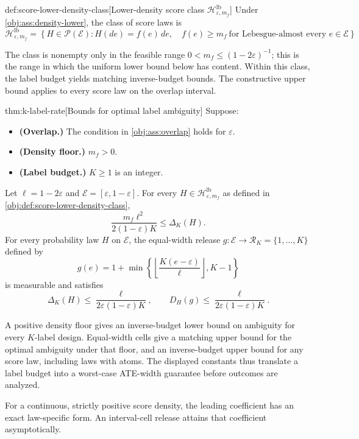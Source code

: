 \documentclass[11pt]{article}
\begin{document}
\begin{definitionv}{def:score-lower-density-class}[Lower-density score class $\mathcal H^{\mathrm{lb}}_{\varepsilon,m_f}$]
Under \cref{obj:ass:density-lower}, the class of score laws is
\[
\mathcal H^{\mathrm{lb}}_{\varepsilon,m_f}
=
\left\{
H\in\mathcal P(\mathcal E):
H(de)=f(e)\,de,\quad
f(e)\ge m_f\ \text{for Lebesgue-almost every }e\in\mathcal E
\right\}.
\]
\end{definitionv}

The class is nonempty only in the feasible range \(0<m_f\le (1-2\varepsilon)^{-1}\); this is the range in which the uniform lower bound below has content. Within this class, the label budget yields matching inverse-budget bounds. The constructive upper bound applies to every score law on the overlap interval.

\begin{theoremv}{thm:k-label-rate}[Bounds for optimal label ambiguity]
Suppose:
\begin{itemize}
\item \textbf{(Overlap.)} The condition in \cref{obj:ass:overlap} holds for \(\varepsilon\).
\item \textbf{(Density floor.)} \(m_f>0\).
\item \textbf{(Label budget.)} \(K\geq 1\) is an integer.
\end{itemize}
Let \(\ell=1-2\varepsilon\) and \(\mathcal E=[\varepsilon,1-\varepsilon]\). For every \(H\in\mathcal H^{\mathrm{lb}}_{\varepsilon,m_f}\) as defined in \cref{obj:def:score-lower-density-class},
\[
\frac{m_f\ell^2}{2(1-\varepsilon)K}\leq\Delta_K(H).
\]
For every probability law \(H\) on \(\mathcal E\), the equal-width release \(g:\mathcal E\to\mathcal R_K=\{1,\ldots,K\}\) defined by
\[
g(e)=1+\min\left\{\left\lfloor\frac{K(e-\varepsilon)}{\ell}\right\rfloor,K-1\right\}
\]
is measurable and satisfies
\[
\Delta_K(H)\leq\frac{\ell}{2\varepsilon(1-\varepsilon)K},
\qquad
D_H(g)\leq\frac{\ell}{2\varepsilon(1-\varepsilon)K}.
\]
\end{theoremv}

A positive density floor gives an inverse-budget lower bound on ambiguity for every \(K\)-label design. Equal-width cells give a matching upper bound for the optimal ambiguity under that floor, and an inverse-budget upper bound for any score law, including laws with atoms. The displayed constants thus translate a label budget into a worst-case ATE-width guarantee before outcomes are analyzed.

For a continuous, strictly positive score density, the leading coefficient has an exact law-specific form. An interval-cell release attains that coefficient asymptotically.
\end{document}
